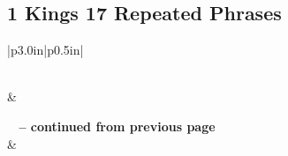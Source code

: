 \subsection{1 Kings 17 Repeated Phrases}


\normalsize
 
\begin{center}
\begin{longtable}{|p{3.0in}|p{0.5in}|}
\caption[1 Kings 17 Repeated Phrases]{1 Kings 17 Repeated Phrases}\label{table:Repeated Phrases 1 Kings 17} \\
\hline {} &  \\ \hline 
\endfirsthead
 
{{\bfseries \tablename\ \thetable{} -- continued from previous page}} \\  
\hline {} &  \\ \hline 
\endhead
 

\end{longtable}
\end{center}
